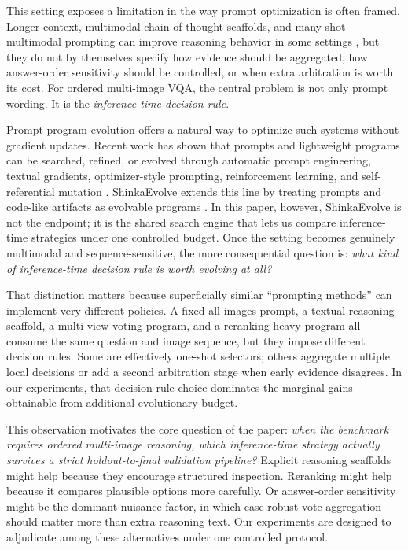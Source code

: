 \documentclass[11pt]{article}
\begin{document}
This setting exposes a limitation in the way prompt optimization is often framed. Longer context, multimodal chain-of-thought scaffolds, and many-shot multimodal prompting can improve reasoning behavior in some settings \citep{zhang2023mmcot,jiang2024manyshot}, but they do not by themselves specify how evidence should be aggregated, how answer-order sensitivity should be controlled, or when extra arbitration is worth its cost. For ordered multi-image VQA, the central problem is not only prompt wording. It is the \emph{inference-time decision rule}.

Prompt-program evolution offers a natural way to optimize such systems without gradient updates. Recent work has shown that prompts and lightweight programs can be searched, refined, or evolved through automatic prompt engineering, textual gradients, optimizer-style prompting, reinforcement learning, and self-referential mutation \citep{zhou2023ape,pryzant2023protegi,yang2024opro,deng2022rlprompt,guo2023evoprompt,fernando2023promptbreeder,khattab2024dspy,yuksekgonul2024textgrad,kwon2024stableprompt}. ShinkaEvolve extends this line by treating prompts and code-like artifacts as evolvable programs \citep{lange2025shinkaevolve}. In this paper, however, ShinkaEvolve is not the endpoint; it is the shared search engine that lets us compare inference-time strategies under one controlled budget. Once the setting becomes genuinely multimodal and sequence-sensitive, the more consequential question is: \emph{what kind of inference-time decision rule is worth evolving at all?}

That distinction matters because superficially similar ``prompting methods'' can implement very different policies. A fixed all-images prompt, a textual reasoning scaffold, a multi-view voting program, and a reranking-heavy program all consume the same question and image sequence, but they impose different decision rules. Some are effectively one-shot selectors; others aggregate multiple local decisions or add a second arbitration stage when early evidence disagrees. In our experiments, that decision-rule choice dominates the marginal gains obtainable from additional evolutionary budget.

This observation motivates the core question of the paper: \emph{when the benchmark requires ordered multi-image reasoning, which inference-time strategy actually survives a strict holdout-to-final validation pipeline?} Explicit reasoning scaffolds might help because they encourage structured inspection. Reranking might help because it compares plausible options more carefully. Or answer-order sensitivity might be the dominant nuisance factor, in which case robust vote aggregation should matter more than extra reasoning text. Our experiments are designed to adjudicate among these alternatives under one controlled protocol.
\end{document}
